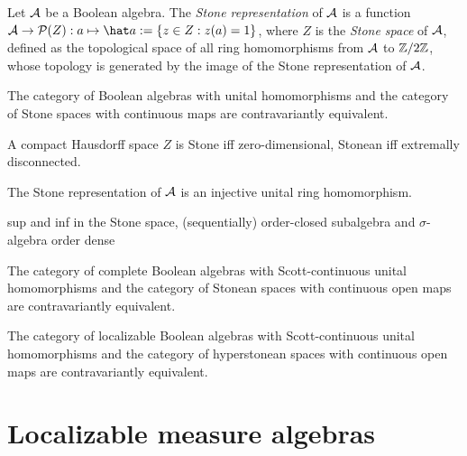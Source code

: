 \documentclass{../../large}
\begin{document}
\begin{prb}
Let $\mathcal{A}$ be a Boolean algebra.
The \emph{Stone representation} of $\mathcal{A}$ is a function $\cA\to\cP(Z):a\mapsto\hat a:=\{z\in Z:z(a)=1\}$, where $Z$ is the \emph{Stone space} of $\mathcal{A}$, defined as the topological space of all ring homomorphisms from $\mathcal{A}$ to $\mathbb{Z}/2\mathbb{Z}$, whose topology is generated by the image of the Stone representation of $\mathcal{A}$.

\begin{parts}
\item The category of Boolean algebras with unital homomorphisms and the category of Stone spaces with continuous maps are contravariantly equivalent.
\end{parts}
\end{prb}
\begin{pf}

A compact Hausdorff space $Z$ is Stone iff zero-dimensional, Stonean iff extremally disconnected.

The Stone representation of $\mathcal{A}$ is an injective unital ring homomorphism.

\end{pf}



\begin{prb}
sup and inf in the Stone space,
(sequentially) order-closed subalgebra and $\sigma$-algebra
order dense
\begin{parts}
\item The category of complete Boolean algebras with Scott-continuous unital homomorphisms and the category of Stonean spaces with continuous open maps are contravariantly equivalent.
\end{parts}
\end{prb}





\begin{prb}
\begin{parts}
\item The category of localizable Boolean algebras with Scott-continuous unital homomorphisms and the category of hyperstonean spaces with continuous open maps are contravariantly equivalent.
\end{parts}
\end{prb}




\section{Localizable measure algebras}
\end{document}
